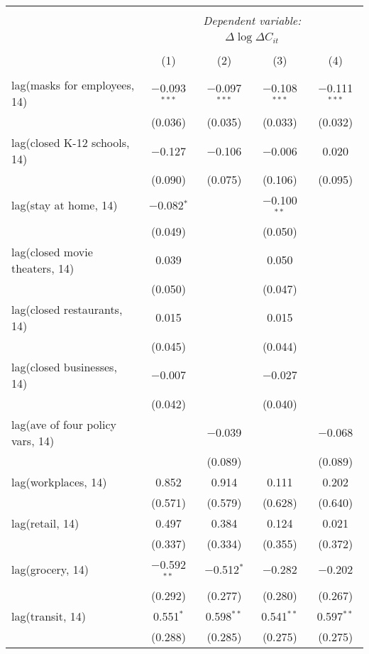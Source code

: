\begin{tabular}{@{\extracolsep{1pt}}lcccc} 
\\[-1.8ex]\hline 
\hline \\[-1.8ex] 
 & \multicolumn{4}{c}{\textit{Dependent variable:}} \\ 
\cline{2-5} 
 & \multicolumn{4}{c}{$\Delta \log \Delta C_{it}$} \\ 
\\[-1.8ex] & (1) & (2) & (3) & (4)\\ 
\hline \\[-1.8ex] 
 lag(masks for employees, 14) & $-$0.093$^{***}$ & $-$0.097$^{***}$ & $-$0.108$^{***}$ & $-$0.111$^{***}$ \\ 
  & (0.036) & (0.035) & (0.033) & (0.032) \\ 
  lag(closed K-12 schools, 14) & $-$0.127 & $-$0.106 & $-$0.006 & 0.020 \\ 
  & (0.090) & (0.075) & (0.106) & (0.095) \\ 
  lag(stay at home, 14) & $-$0.082$^{*}$ &  & $-$0.100$^{**}$ &  \\ 
  & (0.049) &  & (0.050) &  \\ 
  lag(closed movie theaters, 14) & 0.039 &  & 0.050 &  \\ 
  & (0.050) &  & (0.047) &  \\ 
  lag(closed restaurants, 14) & 0.015 &  & 0.015 &  \\ 
  & (0.045) &  & (0.044) &  \\ 
  lag(closed businesses, 14) & $-$0.007 &  & $-$0.027 &  \\ 
  & (0.042) &  & (0.040) &  \\ 
  lag(ave of four policy vars, 14) &  & $-$0.039 &  & $-$0.068 \\ 
  &  & (0.089) &  & (0.089) \\ 
  lag(workplaces, 14) & 0.852 & 0.914 & 0.111 & 0.202 \\ 
  & (0.571) & (0.579) & (0.628) & (0.640) \\ 
  lag(retail, 14) & 0.497 & 0.384 & 0.124 & 0.021 \\ 
  & (0.337) & (0.334) & (0.355) & (0.372) \\ 
  lag(grocery, 14) & $-$0.592$^{**}$ & $-$0.512$^{*}$ & $-$0.282 & $-$0.202 \\ 
  & (0.292) & (0.277) & (0.280) & (0.267) \\ 
  lag(transit, 14) & 0.551$^{*}$ & 0.598$^{**}$ & 0.541$^{**}$ & 0.597$^{**}$ \\ 
  & (0.288) & (0.285) & (0.275) & (0.275) \\ 

\end{tabular}
